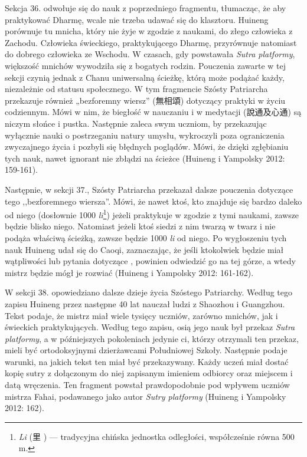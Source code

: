 Sekcja 36. odwołuje się do nauk z poprzedniego fragmentu, tłumacząc, że aby praktykować Dharmę, wcale nie trzeba udawać się do klasztoru.
Huineng porównuje tu mnicha, który nie żyje w zgodzie z naukami, do złego człowieka z Zachodu.
Człowieka świeckiego, praktykującego Dharmę, przyrównuje natomiast do dobrego człowieka ze Wschodu.
W czasach, gdy powstawała \textit{Sutra platformy}, większość mnichów wywodziła się z bogatych rodzin.
Pouczenia zawarte w tej sekcji czynią jednak z Chanu uniwersalną ścieżkę, którą może podążać każdy, niezależnie od statusu społecznego.
W tym fragmencie Szósty Patriarcha przekazuje również „bezforemny wiersz” (無相頌) dotyczący praktyki w życiu codziennym.
Mówi w nim, że biegłość w nauczaniu i w medytacji (說通及心通) są niczym słońce i pustka.
Następnie zaleca swym uczniom, by przekazując wyłącznie nauki o postrzeganiu natury umysłu, wykroczyli poza ograniczenia zwyczajnego życia i pozbyli się błędnych poglądów. %
Mówi, że dzięki zgłębianiu tych nauk, nawet ignorant nie zbłądzi na ścieżce %
(Huineng i Yampolsky 2012: 159-161).

Następnie, w sekcji 37., Szósty Patriarcha przekazał dalsze pouczenia dotyczące tego ,,bezforemnego wiersza''.
Mówi, że nawet ktoś, kto znajduje się bardzo daleko od niego (dosłownie 1000 \textit{li}\footnote{\textit{Li} (里 ) --- tradycyjna chińska jednostka odległości, współcześnie równa 500 m.}) jeżeli praktykuje w zgodzie z tymi naukami, zawsze będzie blisko niego.
Natomiast jeżeli ktoś siedzi z nim twarzą w twarz i nie podąża właściwą ścieżką, zawsze będzie 1000 \textit{li} od niego.
Po wygłoszeniu tych nauk Huineng udał się do Caoqi, zaznaczając, że jeśli ktokolwiek będzie miał wątpliwości lub pytania dotyczące , powinien odwiedzić go na tej górze, a wtedy mistrz będzie mógł je rozwiać %
(Huineng i Yampolsky 2012: 161-162).

W sekcji 38. opowiedziano dalsze dzieje życia Szóstego Patriarchy.
Według tego zapisu Huineng przez następne 40 lat nauczał ludzi z Shaozhou i Guangzhou.
Tekst podaje, że mistrz miał wiele tysięcy uczniów, zarówno mnichów, jak i świeckich praktykujących.
Według tego zapisu, osią jego nauk był przekaz \textit{Sutra platformy}, a w późniejszych pokoleniach jedynie ci, którzy otrzymali ten przekaz, mieli być ortodoksyjnymi dzierżawcami Południowej Szkoły.
Następnie podaje warunki, na jakich tekst ten miał być przekazywany.
Każdy uczeń miał dostać kopię sutry z dołączonym do niej zapisanym imieniem odbiorcy oraz miejscem i datą wręczenia.
Ten fragment powstał prawdopodobnie pod wpływem uczniów mistrza Fahai, podawanego jako autor \textit{Sutry platformy} %
(Huineng i Yampolsky 2012: 162).

